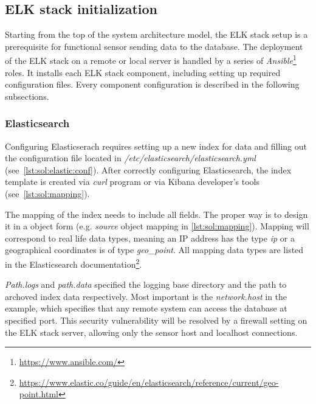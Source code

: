 \documentclass[12pt,a4paper,twoside]{book}
\begin{document}
        \subsection{ELK stack initialization} \label{solution:design:elk}
            Starting from the top of the system architecture model, the ELK stack setup is a prerequisite for functional sensor sending data to the database. The deployment of the ELK stack on a remote or local server is handled by a series of \emph{Ansible}\footnote{\url{https://www.ansible.com/}} roles. It installs each ELK stack component, including setting up required configuration files. Every component configuration is described in the following subsections. 
            \subsubsection*{Elasticsearch}
                Configuring Elasticserach requires setting up a new index for data and filling out the configuration file located in \emph{/etc/elasticsearch/elasticsearch.yml} (see~\autoref{lst:sol:elastic:conf}). After correctly configuring Elasticsearch, the index template is created via \emph{curl} program or via Kibana developer's tools (see~\autoref{lst:sol:mapping}).
                
                The mapping of the index needs to include all fields. The proper way is to design it in a object form (e.g. \emph{source} object mapping in \autoref{lst:sol:mapping}). Mapping will correspond to real life data types, meaning an IP address has the type \emph{ip} or a geographical coordinates is of type \emph{geo\_point}. All mapping data types are listed in the Elasticsearch documentation\footnote{\url{https://www.elastic.co/guide/en/elasticsearch/reference/current/geo-point.html}}.
                \par
                \emph{Path.logs} and \emph{path.data} specified the logging base directory and the path to archoved index data respectively. Most important is the \emph{network.host} in the example, which specifies that any remote system can access the database at specified port. This security vulnerability will be resolved by a firewall setting on the ELK stack server, allowing only the sensor host and localhost connections.
\end{document}
